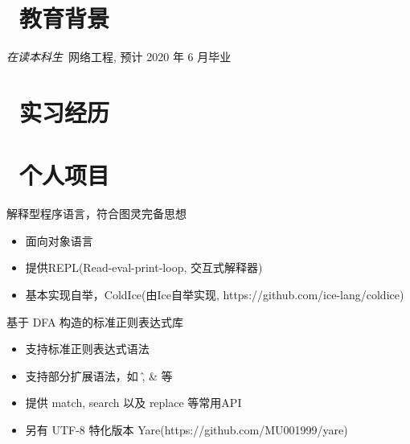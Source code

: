 \documentclass{resume}
\begin{document}



\section{\faGraduationCap\  教育背景}
\textit{在读本科生}\ 网络工程, 预计 2020 年 6 月毕业

\section{\faUsers\ 实习经历}
\role{实习}{深度学习实习生}

\section{\faGithubAlt\ 个人项目}
解释型程序语言，符合图灵完备思想
\begin{onehalfspacing}
\begin{itemize}
  \item 面向对象语言
  \item 提供REPL(Read-eval-print-loop, 交互式解释器)
  \item 基本实现自举，ColdIce(由Ice自举实现, https://github.com/ice-lang/coldice)
\end{itemize}
\end{onehalfspacing}

基于 DFA 构造的标准正则表达式库
\begin{onehalfspacing}
\begin{itemize}
  \item 支持标准正则表达式语法
  \item 支持部分扩展语法，如 \^, \& 等
  \item 提供 match, search 以及 replace 等常用API
  \item 另有 UTF-8 特化版本 Yare(https://github.com/MU001999/yare)
\end{itemize}
\end{onehalfspacing}
\end{document}
